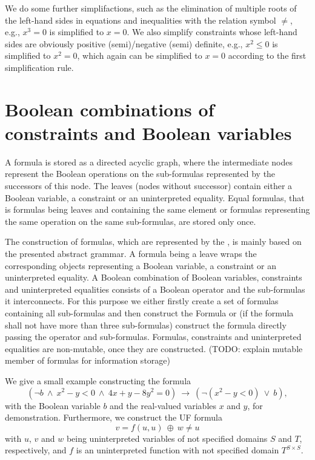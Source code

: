 We do some further simplifactions, such as the elimination of multiple roots of the left-hand sides in equations and inequalities with the relation symbol $\neq$, e.g., $x^3=0$ is simplified to $x=0$. We also simplify constraints whose left-hand sides are obviously positive (semi)/negative (semi) definite, e.g., $x^2\leq 0$ is simplified to $x^2=0$, which again can be simplified to $x=0$ according to the first simplification rule.

\section{Boolean combinations of constraints and Boolean variables}
A formula is stored as a directed acyclic graph, where the intermediate nodes represent the Boolean operations on the sub-formulas represented by the successors of this node. The leaves (nodes without successor) contain either a Boolean variable, a constraint or an uninterpreted equality. Equal formulas, that is formulas being leaves and containing the same element or formulas representing the same operation on the same sub-formulas, are stored only once.

The construction of formulas, which are represented by the \formulaClass, is mainly based on the presented abstract grammar. A formula being a leave wraps the corresponding objects representing a Boolean variable, a constraint or an uninterpreted equality. A Boolean combination of Boolean variables, constraints and uninterpreted equalities consists of a Boolean operator and the sub-formulas it interconnects. For this purpose we either firstly create a set of formulas containing all sub-formulas and then construct the Formula or (if the formula shall not have more than three sub-formulas) construct the formula directly passing the operator and sub-formulas. Formulas, constraints and uninterpreted equalities are non-mutable, once they are constructed. (TODO: explain mutable member of formulas for information storage) 

We give a small example constructing the formula \[(\neg b\ \land\ x^2-y<0\ \land\ 4x+y-8y^2=0 )\ \rightarrow\ (\neg(x^2-y<0)\ \lor\ b ),\] with the Boolean variable $b$ and the real-valued variables $x$ and $y$, for demonstration. Furthermore, we construct the UF formula
\[v = f(u,u)\ \oplus\ w \neq u\]
with $u$, $v$ and $w$ being uninterpreted variables of not specified domains $S$ and $T$, respectively,
and $f$ is an uninterpreted function with not specified domain $T^{S\times S}$.

